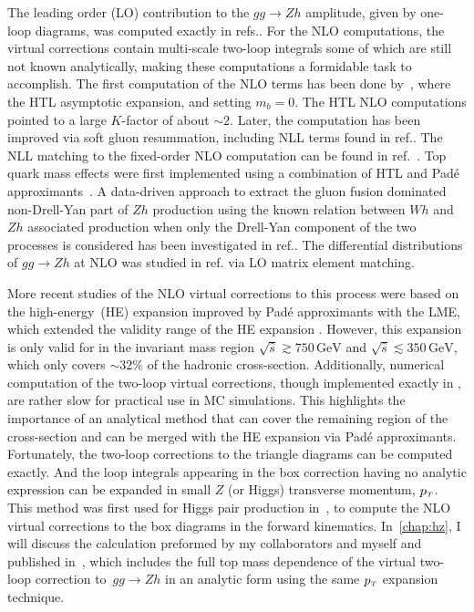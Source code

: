 \par  The leading order (LO) contribution to the $g g \rightarrow Z h$ amplitude, given by one-loop diagrams, was computed exactly in refs.\cite{Kniehl:1990iva, Dicus:1988yh}. For the NLO computations, the virtual corrections contain multi-scale two-loop integrals some of which are still not known analytically, making these computations a formidable task to accomplish. The first computation of the NLO terms has been done by~\cite{Altenkamp:2012sx}, where the HTL asymptotic expansion, and setting $m_b = 0$. The HTL NLO computations  pointed to a large $K$-factor of about $\sim2$.  Later, the computation has been improved via soft gluon resummation, including NLL terms found in ref.\cite{Harlander:2014wda}. The NLL matching to the fixed-order NLO computation can be found in ref.~\cite{Altenkamp:2012sx}.  Top quark mass effects were first implemented using a combination of  HTL  and Pad\'e approximants~\cite{Hasselhuhn:2016rqt}. A data-driven approach to extract the gluon fusion dominated non-Drell-Yan part of $Zh$ production using the known relation between  $Wh$
and $ Z h$ associated production when only the Drell-Yan component of the two processes is considered has been investigated in ref.\cite{Harlander:2018yns}. The differential distributions of $g g \rightarrow Zh$  at NLO was studied in ref.\cite{Hespel:2015zea} via LO matrix element matching. 
\par More recent studies of the NLO virtual corrections to this process were based on the high-energy~(HE) expansion improved by Pad\'e approximants with the LME, which extended the validity range of the HE expansion \cite{Davies:2020drs}. However, this expansion is only valid for in the invariant mass region $\sqrt{\hat{s}}  \gtrsim 750\, \si{\GeV} $ and $\sqrt{\hat{s}}  \lesssim 350\,  \si{\GeV}$,  which only covers $\sim 32\%$ of the hadronic cross-section. Additionally, numerical computation of the two-loop virtual corrections, though implemented exactly in  \cite{Chen:2020gae}, are rather slow for practical use in MC simulations.  This highlights the importance of an analytical method that can cover the remaining region of the cross-section and can be merged with the HE expansion via Pad\'e approximants. Fortunately, the two-loop corrections to the triangle diagrams can be computed exactly. And the loop integrals appearing in the box correction having no analytic expression can be expanded in small  $Z$ (or Higgs) 
transverse momentum, $p_{\scriptscriptstyle T}$. This method was first used for Higgs pair production in~\cite{Bonciani:2018omm}, to compute the NLO virtual corrections to the box diagrams in the forward kinematics. In~\autoref{chap:hz}, I will discuss the calculation preformed by my collaborators and myself and published in~\cite{Alasfar:2021ppe}, which includes the full top mass dependence of the virtual two-loop correction to~$ gg \to Zh$ in an  analytic form  using the same $p_{\scriptscriptstyle T}$ expansion technique.

